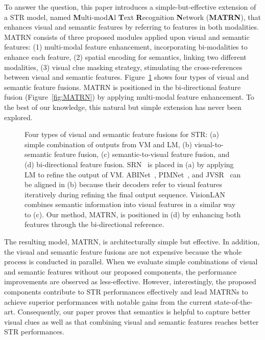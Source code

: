 \documentclass[runningheads]{llncs}
\begin{document}
To answer the question, this paper introduces a simple-but-effective extension of a STR model, named \textbf{M}ulti-mod\textbf{A}l \textbf{T}ext \textbf{R}ecognition \textbf{N}etwork (\textbf{MATRN}), that enhances visual and semantic features by referring to features in both modalities. MATRN consists of three proposed modules applied upon visual and semantic features: (1) multi-modal feature enhancement, incorporating bi-modalities to enhance each feature, (2) spatial encoding for semantics, linking two different modalities, (3) visual clue masking strategy, stimulating the cross-references between visual and semantic features. Figure~\ref{fig:Models} shows four types of visual and semantic feature fusions. MATRN is positioned in the bi-directional feature fusion (Figure~\ref{fig:MATRN}) by applying multi-modal feature enhancement. To the best of our knowledge, this natural but simple extension has never been explored.  

\begin{figure}[t]
    \centering
    \label{fig:Models}
    \caption{
    Four types of visual and semantic feature fusions for STR: (a) simple combination of outputs from VM and LM, (b) visual-to-semantic feature fusion, (c) semantic-to-visual feature fusion, and (d) bi-directional feature fusion. SRN~\cite{Yu_2020_CVPR_SRN} is placed in (a) by applying LM to refine the output of VM. ABINet~\cite{ABINet}, PIMNet~\cite{PIMNet}, and JVSR~\cite{JVSR} can be aligned in (b) because their decoders refer to visual features iteratively during refining the final output sequence. VisionLAN~\cite{VisionLAN} combines semantic information into visual features in a similar way to (c). Our method, MATRN, is positioned in (d) by enhancing both features through the bi-directional reference.}
\end{figure}

The resulting model, MATRN, is architecturally simple but effective. In addition, the visual and semantic feature fusions are not expensive because the whole process is conducted in parallel. When we evaluate simple combinations of visual and semantic features without our proposed components, the performance improvements are observed as less-effective. However, interestingly, the proposed components contribute to STR performances effectively and lead MATRNs to achieve superior performances with notable gains from the current state-of-the-art. Consequently, our paper proves that semantics is helpful to capture better visual clues as well as that combining visual and semantic features reaches better STR performances.
\end{document}

